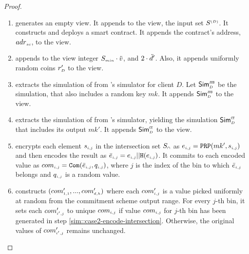 \begin{proof}
\begin{enumerate}
%
\item generates an empty view. It appends to the view, the input set $S^{\scriptscriptstyle (D)}$. It constructs and deploys a smart contract. It appends the contract's address, $ {adr}_{\scriptscriptstyle sc}$, to the view. 


\item appends to the view integer $S_{\scriptscriptstyle min}\cdot \ddot{v}$, and $2\cdot \ddot{d}'$. Also, it appends uniformly random coins $r'_{\scriptscriptstyle D}$ to the view. 

%
\item extracts the simulation of \fpsi from \fpsi's simulator for client $D$. Let $\mathsf{Sim}^{\scriptscriptstyle \mathtt{JUS}}_{\scriptscriptstyle D}$ be the simulation, that also includes a random key $mk$. It appends $\mathsf{Sim}^{\scriptscriptstyle \mathtt{JUS}}_{\scriptscriptstyle D}$ to the view. 


%
 \item extracts the simulation of \ct from \ct's simulator, yielding  the simulation $\mathsf{Sim}^{\scriptscriptstyle \mathtt{CT}}_{\scriptscriptstyle D}$ that includes its output $mk'$. It appends $\mathsf{Sim}^{\scriptscriptstyle \mathtt{CT}}_{\scriptscriptstyle D}$ to the view. 
 
%
 
 \item\label{sim::case2-encode-intersection} encrypts each element $s_{\scriptscriptstyle i,j}$ in the intersection set $S_{\scriptscriptstyle \cap}$  as $e_{\scriptscriptstyle i,j}=\mathtt{PRP}(mk', s_{\scriptscriptstyle i,j})$ and then encodes the result as $\bar{e}_{\scriptscriptstyle i,j} = e_{\scriptscriptstyle i,j}||\mathtt{H}(e_{\scriptscriptstyle i, j})$. It commits to each encoded value as $com_{\scriptscriptstyle i,j}=\mathtt{Com}(\bar{e}_{\scriptscriptstyle i,j}, q_{\scriptscriptstyle i,j})$, where $j$ is the index of the bin to which $\bar{e}_{\scriptscriptstyle i,j}$ belongs and  $q_{\scriptscriptstyle i, j}$ is a random value. 
 
 
 
  \item\label{sim::case2-gen-commitments} constructs $(com'_{\scriptscriptstyle 1,1}, ..., com'_{\scriptscriptstyle d, h})$ where each $com'_{\scriptscriptstyle i, j}$ is a value picked uniformly at random from the commitment scheme output range. For every $j$-th bin, it sets each  $com'_{\scriptscriptstyle i', j}$ to unique $com_{\scriptscriptstyle i,j}$ if value $com_{\scriptscriptstyle i,j}$ for $j$-th bin has been generated in step \ref{sim::case2-encode-intersection}. Otherwise, the original values of $com'_{\scriptscriptstyle i', j}$ remains unchanged. 
 

\end{enumerate}
\end{proof}
